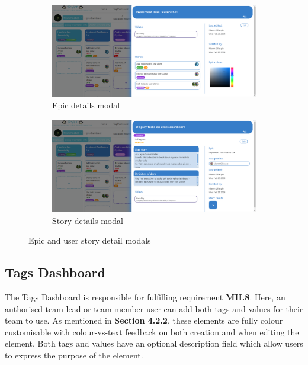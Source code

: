 \documentclass[l4proj.tex]{subfiles}
\begin{document}
\begin{figure}[h!]
\centering
\begin{subfigure}{.5\textwidth}
\centering
\includegraphics[scale=0.17]{dissertation/images/EpicDetails.png}
\caption{Epic details modal}
\end{subfigure}%
\begin{subfigure}{.5\textwidth}
\centering
\includegraphics[scale=0.17]{dissertation/images/StoryDetails.png}
\caption{Story details modal}
\end{subfigure}

\caption{Epic and user story detail modals}
\label{fig:detail modals}
\end{figure}

\subsection{Tags Dashboard}
The Tags Dashboard is responsible for fulfilling requirement \textbf{MH.8}. Here, an authorised team lead or team member user can add both tags and values for their team to use. As mentioned in \textbf{Section 4.2.2}, these elements are fully colour customisable with colour-vs-text feedback on both creation and when editing the element. Both tags and values have an optional description field which allow users to express the purpose of the element. 
\end{document}
